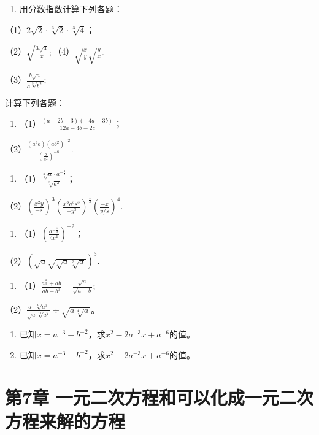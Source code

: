 \begin{enumerate}
\item
  用分数指数计算下列各题：
\end{enumerate}

（1）\(2\sqrt{2} \cdot \sqrt[3]{2} \cdot \sqrt[3]{4}\)；

（2）\(\sqrt{\frac{3\sqrt{4}}{x}};\)（4）\(\sqrt{\frac{x}{y}}\sqrt{\frac{y}{x}}.\)

（3）\(\frac{b\sqrt{a}}{a\sqrt[3]{b^2}};\)

计算下列各题：

\begin{enumerate}[start=2]
\item
  （1）\(\frac{(a - 2b - 3)(-4a - 3b)}{12a - 4b - 2c}\)；
\end{enumerate}

（2）\(\frac{(a^2b)(ab^2)^{-2}}{\left(\frac{b}{a^2}\right)^{-8}}.\)

\begin{enumerate}[start=3]
\item
  （1）\(\frac{\sqrt[3]{a} \cdot a^{-\frac{3}{2}}}{\sqrt[3]{a^2}}\)；
\end{enumerate}

（2）\(\left(\frac{x^2y}{-s}\right)^3\left(\frac{x^3a^3s^3}{-y^3}\right)^{\frac{1}{3}}\left(\frac{-x}{y/s}\right)^4.\)

\begin{enumerate}[start=4]
\item
  （1）\(\left(\frac{a^{-\frac{1}{3}}}{4c^2}\right)^{-2}\)；
\end{enumerate}

（2）\((\sqrt{a}\sqrt{\sqrt{a}\sqrt[3]{a}})^3.\)

\begin{enumerate}[start=5]
\item
  （1）\(\frac{a^{\frac{2}{3}} + ab}{ab - b^3} - \frac{\sqrt{a}}{\sqrt{a - b}};\)
\end{enumerate}

（2）\(\frac{a \cdot \sqrt[8]{a^3}}{\sqrt{a} \sqrt[10]{a^2}} \div \sqrt{a \sqrt[4]{a}}\)。

\begin{enumerate}[start=6]
\item
  已知\(x = a^{-3} + b^{-2}\)，求\(x^{2} - 2a^{-3}x + a^{-6}\)的值。
\item
  已知\(x = a^{-3} + b^{-2}\)，求\(x^{2} - 2a^{-3}x + a^{-6}\)的值。
\end{enumerate}

\chapter{第7章 一元二次方程和可以化成一元二次方程来解的方程}

